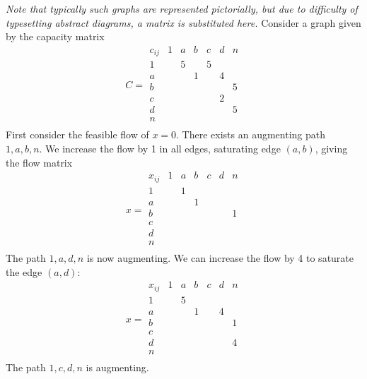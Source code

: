 \begin{example}
	\textit{Note that typically such graphs are represented pictorially, but due to difficulty of typesetting abstract diagrams, a matrix is substituted here.}
	Consider a graph given by the capacity matrix
	\[
		C = \begin{array}{c|cccccc}
			c_{ij} & 1 & a & b & c & d & n \\\hline
			1      &   & 5 &   & 5         \\
			a      &   &   & 1 &   & 4     \\
			b      &   &   &   &   &   & 5 \\
			c      &   &   &   &   & 2     \\
			d      &   &   &   &   &   & 5 \\
			n                              \\
		\end{array}
	\]
	First consider the feasible flow of \( x = 0 \).
	There exists an augmenting path \( 1, a, b, n \).
	We increase the flow by 1 in all edges, saturating edge \( (a,b) \), giving the flow matrix
	\[
		x = \begin{array}{c|cccccc}
			x_{ij} & 1 & a & b & c & d & n \\\hline
			1      &   & 1 &   &   &   &   \\
			a      &   &   & 1 &   &   &   \\
			b      &   &   &   &   &   & 1 \\
			c      &   &   &   &   &   &   \\
			d      &   &   &   &   &   &   \\
			n                              \\
		\end{array}
	\]
	The path \( 1, a, d, n \) is now augmenting.
	We can increase the flow by 4 to saturate the edge \( (a,d) \):
	\[
		x = \begin{array}{c|cccccc}
			x_{ij} & 1 & a & b & c & d & n \\\hline
			1      &   & 5 &   &   &   &   \\
			a      &   &   & 1 &   & 4 &   \\
			b      &   &   &   &   &   & 1 \\
			c      &   &   &   &   &   &   \\
			d      &   &   &   &   &   & 4 \\
			n                              \\
		\end{array}
	\]
	The path \( 1,c,d,n \) is augmenting.

\end{example}
